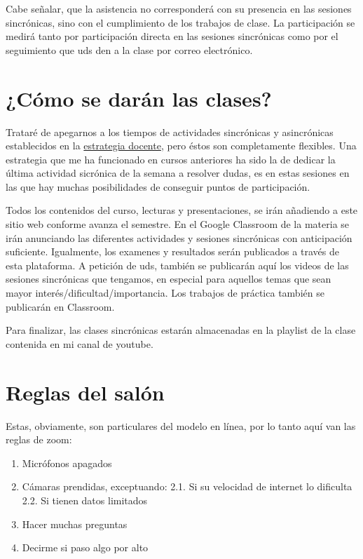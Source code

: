 \documentclass[
]{book}
\providecommand{\tightlist}{%
  \setlength{\itemsep}{0pt}\setlength{\parskip}{0pt}}
\begin{document}
Cabe señalar, que la asistencia no corresponderá con su presencia en las sesiones sincrónicas, sino con el cumplimiento de los trabajos de clase. La participación se medirá tanto por participación directa en las sesiones sincrónicas como por el seguimiento que uds den a la clase por correo electrónico.

\hypertarget{cuxf3mo-se-daruxe1n-las-clases}{%
\section{¿Cómo se darán las clases?}\label{cuxf3mo-se-daruxe1n-las-clases}}

Trataré de apegarnos a los tiempos de actividades sincrónicas y asincrónicas establecidos en la \href{Estrategia-docente.pdf}{estrategia docente}, pero éstos son completamente flexibles. Una estrategia que me ha funcionado en cursos anteriores ha sido la de dedicar la última actividad sicrónica de la semana a resolver dudas, es en estas sesiones en las que hay muchas posibilidades de conseguir puntos de participación.

Todos los contenidos del curso, lecturas y presentaciones, se irán añadiendo a este sitio web conforme avanza el semestre. En el Google Classroom de la materia se irán anunciando las diferentes actividades y sesiones sincrónicas con anticipación suficiente. Igualmente, los examenes y resultados serán publicados a través de esta plataforma. A petición de uds, también se publicarán aquí los videos de las sesiones sincrónicas que tengamos, en especial para aquellos temas que sean mayor interés/dificultad/importancia. Los trabajos de práctica también se publicarán en Classroom.

Para finalizar, las clases sincrónicas estarán almacenadas en la playlist de la clase contenida en mi canal de youtube.

\hypertarget{reglas-del-saluxf3n}{%
\section{Reglas del salón}\label{reglas-del-saluxf3n}}

Estas, obviamente, son particulares del modelo en línea, por lo tanto aquí van las reglas de zoom:

\begin{enumerate}
\def\labelenumi{\arabic{enumi}.}
\tightlist
\item
  Micrófonos apagados
\item
  Cámaras prendidas, exceptuando:
  2.1. Si su velocidad de internet lo dificulta
  2.2. Si tienen datos limitados
\item
  Hacer muchas preguntas
\item
  Decirme si paso algo por alto
\end{enumerate}
\end{document}
